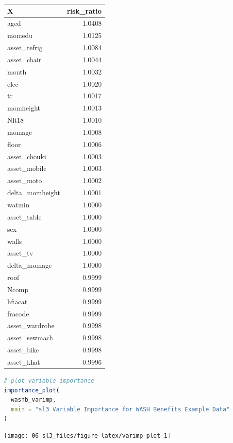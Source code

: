 \documentclass[
  12pt, krantz2,
]{krantz}
\newcommand{\1}{\mathbbm{1}}
\theoremstyle{definition}
\theoremstyle{definition}
\theoremstyle{definition}
\theoremstyle{definition}
\theoremstyle{remark}
\begin{document}
\begin{table}
\centering
\begin{tabular}{l|r}
\hline
X & risk\_ratio\\
\hline
aged & 1.0408\\
\hline
momedu & 1.0125\\
\hline
asset\_refrig & 1.0084\\
\hline
asset\_chair & 1.0044\\
\hline
month & 1.0032\\
\hline
elec & 1.0020\\
\hline
tr & 1.0017\\
\hline
momheight & 1.0013\\
\hline
Nlt18 & 1.0010\\
\hline
momage & 1.0008\\
\hline
floor & 1.0006\\
\hline
asset\_chouki & 1.0003\\
\hline
asset\_mobile & 1.0003\\
\hline
asset\_moto & 1.0002\\
\hline
delta\_momheight & 1.0001\\
\hline
watmin & 1.0000\\
\hline
asset\_table & 1.0000\\
\hline
sex & 1.0000\\
\hline
walls & 1.0000\\
\hline
asset\_tv & 1.0000\\
\hline
delta\_momage & 1.0000\\
\hline
roof & 0.9999\\
\hline
Ncomp & 0.9999\\
\hline
hfiacat & 0.9999\\
\hline
fracode & 0.9999\\
\hline
asset\_wardrobe & 0.9998\\
\hline
asset\_sewmach & 0.9998\\
\hline
asset\_bike & 0.9998\\
\hline
asset\_khat & 0.9996\\
\hline
\end{tabular}
\end{table}

\begin{lstlisting}[language=R]
# plot variable importance
importance_plot(
  washb_varimp,
  main = "sl3 Variable Importance for WASH Benefits Example Data"
)
\end{lstlisting}

\begin{center}\texttt{[image: 06-sl3\_files/figure-latex/varimp-plot-1]} \end{center}
\end{document}
